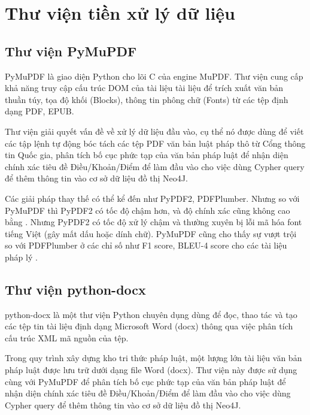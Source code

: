 \documentclass[../DoAn.tex]{subfiles}
\begin{document}
\section{Thư viện tiền xử lý dữ liệu}
\label{section:3.3}


\subsection{Thư viện PyMuPDF}
\label{subsection:3.3.1}


PyMuPDF \cite{PyMuPDFDoc} là giao diện Python cho lõi C của engine MuPDF. Thư viện cung cấp khả năng truy cập cấu trúc DOM của tài liệu tài liệu để trích xuất văn bản thuần túy, tọa độ khối (Blocks), thông tin phông chữ (Fonts) từ các tệp định dạng PDF, EPUB.


Thư viện giải quyết vấn đề về xử lý dữ liệu đầu vào, cụ thể nó được dùng để viết các tập lệnh tự động bóc tách các tệp PDF văn bản luật pháp thô từ Cổng thông tin Quốc gia, phân tích bố cục phức tạp của văn bản pháp luật để nhận diện chính xác tiêu đề Điều/Khoản/Điểm để làm đầu vào cho việc dùng Cypher query để thêm thông tin vào cơ sở dữ liệu đồ thị Neo4J.


Các giải pháp thay thế có thể kể đến như PyPDF2, PDFPlumber. Nhưng so với PyMuPDF thì PyPDF2 có tốc độ chậm hơn, và độ chính xác cũng không cao bằng \cite{paudel2026optimizingnepalipdfextraction}. Nhưng PyPDF2 có tốc độ xử lý chậm và thường xuyên bị lỗi mã hóa font tiếng Việt (gây mất dấu hoặc dính chữ). PyMuPDF cũng cho thấy sự vượt trội so với PDFPlumber ở các chỉ số như F1 score, BLEU-4 score cho các tài liệu pháp lý \cite{adhikari2025comparativestudypdfparsing}.


\subsection{Thư viện python-docx}
\label{subsection:3.3.2}


python-docx \cite{python-docxDoc} là một thư viện Python chuyên dụng dùng để đọc, thao tác và tạo các tệp tin tài liệu định dạng Microsoft Word (docx) thông qua việc phân tích cấu trúc XML mã nguồn của tệp.


Trong quy trình xây dựng kho tri thức pháp luật, một lượng lớn tài liệu văn bản pháp luật được lưu trữ dưới dạng file Word (docx). Thư viện này được sử dụng cùng với PyMuPDF để phân tích bố cục phức tạp của văn bản pháp luật để nhận diện chính xác tiêu đề Điều/Khoản/Điểm để làm đầu vào cho việc dùng Cypher query để thêm thông tin vào cơ sở dữ liệu đồ thị Neo4J.
\end{document}

